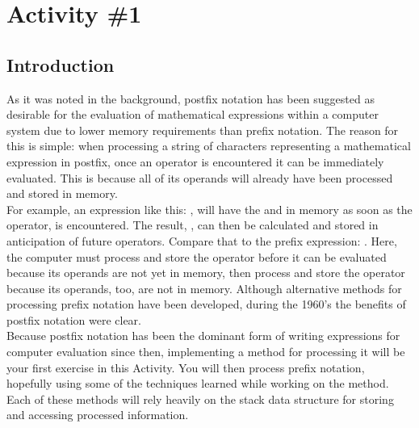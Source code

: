 	\pagebreak

	\section{Activity \#1}
		\subsection{Introduction}
			As it was noted in the background, postfix notation has been suggested as desirable for the evaluation of mathematical expressions within a computer system due to lower memory requirements than prefix notation. The reason for this is simple: when processing a string of characters representing a mathematical expression in postfix, once an operator is encountered it can be immediately evaluated. This is because all of its operands will already have been processed and stored in memory.\\[\baselineskip]
			For example, an expression like this: , will have the  and  in memory as soon as the operator, \code{+} is encountered. The result, , can then be calculated and stored in anticipation of future operators. Compare that to the prefix expression: . Here, the computer must process and store the \code{-} operator before it can be evaluated because its operands are not yet in memory, then process and store the \code{+} operator because its operands, too, are not in memory. Although alternative methods for processing prefix notation have been developed, during the 1960's the benefits of postfix notation were clear.\\[\baselineskip]
			Because postfix notation has been the dominant form of writing expressions for computer evaluation since then, implementing a method for processing it will be your first exercise in this Activity. You will then process prefix notation, hopefully using some of the techniques learned while working on the  method. Each of these methods will rely heavily on the stack data structure for storing and accessing processed information.

